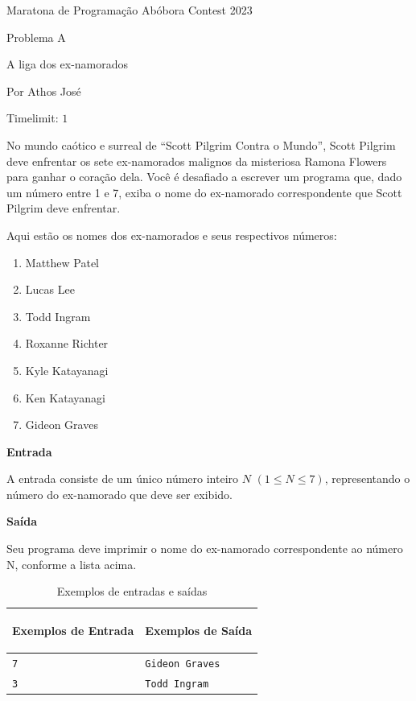 \begin{center}
{{Maratona de Programação Abóbora Contest 2023}}

Problema A

A liga dos ex-namorados

{\tiny Por Athos José}

Timelimit: $1$	
\end{center}

No mundo caótico e surreal de ``Scott Pilgrim Contra o Mundo'', Scott Pilgrim deve enfrentar os sete ex-namorados malignos da misteriosa Ramona Flowers para ganhar o coração dela. Você é desafiado a escrever um programa que, dado um número entre 1 e 7, exiba o nome do ex-namorado correspondente que Scott Pilgrim deve enfrentar.

Aqui estão os nomes dos ex-namorados e seus respectivos números:
\begin{enumerate}
    \item Matthew Patel
    \item Lucas Lee
    \item Todd Ingram
    \item Roxanne Richter
    \item Kyle Katayanagi
    \item Ken Katayanagi
    \item Gideon Graves
\end{enumerate}

\vspace{0.3cm}
\textbf{Entrada}

A entrada consiste de um único número inteiro $N$ $(1 \leq N \leq 7)$, representando o número do ex-namorado que deve ser exibido.

\vspace{0.3cm}
\textbf{Saída}

Seu programa deve imprimir o nome do ex-namorado correspondente ao número N, conforme a lista acima.

\begin{table}[ht]
    \centering
    \begin{tabular}{|p{7cm}|p{7cm}|}
        \hline
        \begin{center}
            \vspace{-0.3cm}
            \textbf{Exemplos de Entrada}
            \vspace{-0.3cm}
        \end{center} 
         &  
        \begin{center}
            \vspace{-0.3cm}
            \textbf{Exemplos de Saída}
            \vspace{-0.3cm}
        \end{center} \\ \hline
         \texttt{7} & \texttt{Gideon Graves} \\
         \hline
         \texttt{3} & \texttt{Todd Ingram} \\
         \hline
    \end{tabular}
    
    \caption{Exemplos de entradas e saídas}
    \label{tab:inputA}
    
\end{table}

\newpage

\begin{center}
\noindent

\end{center}